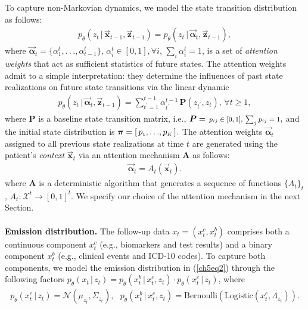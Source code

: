 \documentclass [PhD] {uclathes}
\begin{document}
To capture non-Markovian dynamics, we model the state transition distribution as follows: 
\begin{align}
p_{\theta}(z_{t}\,|\,\boldsymbol{\vec{x}}_{t-1}, \boldsymbol{\vec{z}}_{t-1}) = p_{\theta}(z_{t}\,|\,\boldsymbol{\vec{\alpha}}_{t}, \boldsymbol{\vec{z}}_{t-1}),
\label{ch5eq3}
\end{align}
where $\boldsymbol{\vec{\alpha}}_{t} = \{\alpha^t_1,.\,.\,.,\alpha^t_{t-1}\}$, $\alpha^t_i \in [0,1], \forall i$, $\sum_{i} \alpha^t_i = 1$, is a set of {\it attention weights} that act as sufficient statistics of future states. The attention weights admit to a simple interpretation: they determine the influences of past state realizations on future state transitions via the linear dynamic
\begin{align}
p_{\theta}(z_{t}\,|\,\boldsymbol{\vec{\alpha}}_{t}, \boldsymbol{\vec{z}}_{t-1}) = \sum^{t-1}_{t^{\prime}=1} \alpha^{t-1}_{t^{\prime}}\,\boldsymbol{P}(z_{t^{\prime}},z_{t}),\, \forall t \geq 1,
\label{ch5eq4}
\end{align}
where $\boldsymbol{P}$ is a baseline state transition matrix, i.e., $\boldsymbol{P} = \,\mbox{\footnotesize $p_{\mbox{\tiny $ij$}} \in [0,1],\, \sum_{j}p_{\mbox{\tiny $ij$}} = 1$},$ and the initial state distribution is $\boldsymbol{\pi} = [\,p_{\mbox{\tiny $1$}},.\,.\,.,p_{\mbox{\tiny $K$}}\,].$ The attention weights $\boldsymbol{\vec{\alpha}}_{t}$ assigned to all previous state realizations at time $t$ are generated using the patient's {\it context} $\boldsymbol{\vec{x}}_t$ via an attention mechanism $\boldsymbol{A}$ as follows: 
\begin{align}
\boldsymbol{\vec{\alpha}}_{t} = A_t(\boldsymbol{\vec{x}}_{t}). 
\label{ch5eq5}
\end{align}
where $\boldsymbol{A}$ is a deterministic algorithm that generates a sequence of functions $\{A_t\}_t$, $A_t:\mathcal{X}^t \to [0,1]^t$. We specify our choice of the attention mechanism in the next Section.\\ 
\\
{\bf Emission distribution.} The follow-up data $x_t = (x^c_{t},x^b_{t})$ comprises both a continuous component $x^c_{t}$ (e.g., biomarkers and test results) and a binary component $x^b_{t}$ (e.g., clinical events and ICD-10 codes). To capture both components, we model the emission distribution in (\ref{ch5eq2}) through the following factors $p_{\theta}(x_{t}\,|\,z_{t}) = p_{\theta}(x^b_{t}\,|\,x^c_{t},z_{t})\cdot p_{\theta}(x^c_{t}\,|\,z_{t})$, where
\begin{align}
p_{\theta}(x^c_{t}\,|\,z_{t}) = \mathcal{N}(\mu_{z_{t}},\Sigma_{z_{t}}),\,\,\,\, 
p_{\theta}(x^b_{t}\,|\,x^c_{t},z_{t}) = \mbox{Bernoulli}(\mbox{Logistic}(x^c_{t},\Lambda_{z_{t}})). 
\label{ch5eq6}
\end{align}   
\end{document}
